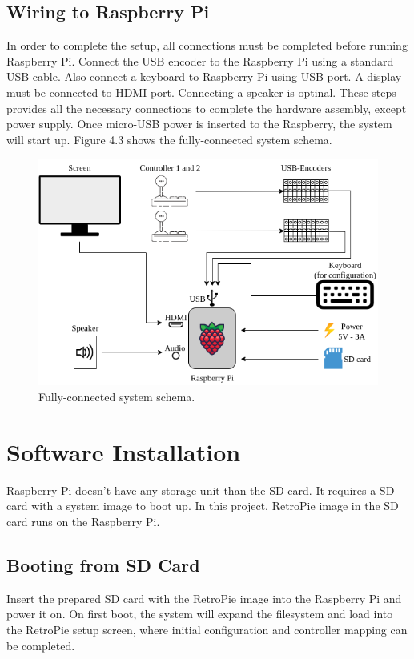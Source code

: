 \subsection{Wiring to Raspberry Pi}
\label{subsec:wiring_raspberry_pi}
In order to complete the setup, all connections must be completed before running Raspberry Pi. Connect the USB encoder to the Raspberry Pi using a standard USB cable. Also connect a keyboard to Raspberry Pi using USB port. 
A display must be connected to HDMI port. Connecting a speaker is optinal. These steps provides all the necessary connections to complete the hardware assembly, except power supply. Once micro-USB power is inserted to the Raspberry, the system will start up. 
Figure 4.3 shows the fully-connected system schema. 
\\
\begin{figure}[htb] 
	\centering  
	\includegraphics[scale=0.285]{F_Figures/system_schema.png}
	\caption{Fully-connected system schema.}
	\label{fig:system_schmema}
\end{figure} 

\section{Software Installation}
\label{sec:software_installation}
Raspberry Pi doesn't have any storage unit than the SD card. It requires a SD card with a system image to boot up. 
In this project, RetroPie image in the SD card runs on the Raspberry Pi.
\subsection{Booting from SD Card}
\label{subsec:booting_sd_card}
Insert the prepared SD card with the RetroPie image into the Raspberry Pi and power it on. On first boot, the system will expand the filesystem and load into the RetroPie setup screen, where initial configuration and controller mapping can be completed.  
